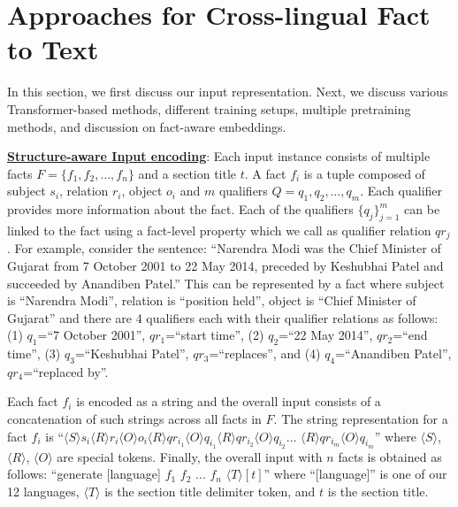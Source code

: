 \documentclass[runningheads]{llncs}
\begin{document}
\section{Approaches for Cross-lingual Fact to Text}
\label{sec:approach}
In this section, we first discuss our input representation. Next, we discuss various Transformer-based methods, different training setups, multiple pretraining methods, and discussion on fact-aware embeddings.

\noindent\underline{\textbf{Structure-aware Input encoding}}: 
Each input instance consists of multiple facts $F=\{f_1, f_2, \ldots, f_n\}$ and a section title $t$. A fact $f_i$ is a tuple composed of subject $s_i$, relation $r_i$, object $o_i$ and $m$ qualifiers $Q={q_1, q_2,\ldots, q_m}$. Each qualifier provides more information about the fact. Each of the qualifiers $\{q_j\}_{j=1}^m$ can be linked to the fact using a fact-level property which we call as qualifier relation $qr_j$. For example, consider the sentence: ``Narendra Modi was the Chief Minister of Gujarat from 7 October 2001 to 22 May 2014, preceded by Keshubhai Patel and succeeded by Anandiben Patel.'' This can be represented by a fact where subject is ``Narendra Modi'', relation is ``position held'', object is ``Chief Minister of Gujarat'' and there are 4 qualifiers each with their qualifier relations as follows: (1) $q_1$=``7 October 2001'', $qr_1$=``start time'', (2) $q_2$=``22 May 2014'', $qr_2$=``end time'', (3) $q_3$=``Keshubhai Patel'', $qr_3$=``replaces'', and (4) $q_4$=``Anandiben Patel'', $qr_4$=``replaced by''. 

Each fact $f_i$ is encoded as a string and the overall input consists of a concatenation of such strings across all facts in $F$. The string representation for a fact $f_i$ is ``$\langle S\rangle  s_i \langle R\rangle  r_i \langle O\rangle  o_i \langle R\rangle  qr_{i_1} \langle O\rangle  q_{i_1}  \langle R\rangle  qr_{i_2} \langle O\rangle q_{i_2} \ldots$  $\langle R\rangle  qr_{i_m} \langle O\rangle  q_{i_m}$'' where $\langle S\rangle$, $\langle R\rangle$, $\langle O\rangle$ are special tokens. Finally, the overall input with $n$ facts is obtained as follows: ``generate [language] $f_1$ $f_2$ $\ldots$ $f_n$ $\langle T \rangle [t]$'' where ``[language]'' is one of our 12 languages, $\langle T \rangle$ is the section title delimiter token, and $t$ is the section title.
\end{document}
